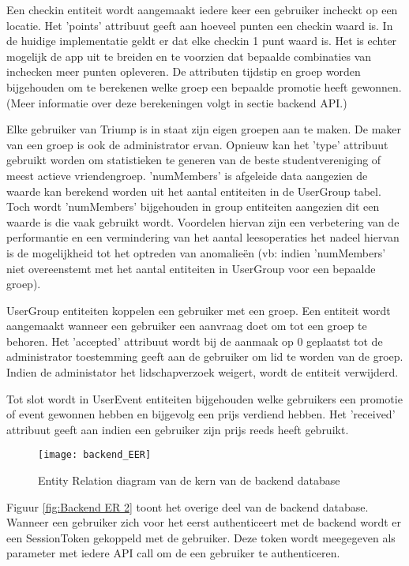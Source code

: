 Een checkin entiteit wordt aangemaakt iedere keer een gebruiker incheckt op een locatie. Het 'points' attribuut geeft aan hoeveel punten een checkin waard is. In de huidige implementatie geldt er dat elke checkin 1 punt waard is. Het is echter mogelijk de app uit te breiden en te voorzien dat bepaalde combinaties van inchecken meer punten opleveren. De attributen tijdstip en groep worden bijgehouden om te berekenen welke groep een bepaalde promotie heeft gewonnen. (Meer informatie over deze berekeningen volgt in sectie backend API.)

Elke gebruiker van Triump is in staat zijn eigen groepen aan te maken. De maker van een groep is ook de administrator ervan. Opnieuw kan het 'type' attribuut gebruikt worden om statistieken te generen van de beste studentvereniging of meest actieve vriendengroep. 'numMembers' is afgeleide data aangezien de waarde kan berekend worden uit het aantal entiteiten in de UserGroup tabel. Toch wordt 'numMembers' bijgehouden in group entiteiten aangezien dit een waarde is die vaak gebruikt wordt. Voordelen hiervan zijn een verbetering van de performantie en een vermindering van het aantal leesoperaties het nadeel hiervan is de mogelijkheid tot het optreden van anomalieën (vb: indien 'numMembers' niet overeenstemt met het aantal entiteiten in UserGroup voor een bepaalde groep).

UserGroup entiteiten koppelen een gebruiker met een groep. Een entiteit wordt aangemaakt wanneer een gebruiker een aanvraag doet om tot een groep te behoren. Het 'accepted' attribuut wordt bij de aanmaak op 0 geplaatst tot de administrator toestemming geeft aan de gebruiker om lid te worden van de groep. Indien de administator het lidschapverzoek weigert, wordt de entiteit verwijderd.

Tot slot wordt in UserEvent entiteiten bijgehouden welke gebruikers een promotie of event gewonnen hebben en bijgevolg een prijs verdiend hebben. Het 'received' attribuut geeft aan indien een gebruiker zijn prijs reeds heeft gebruikt.

\begin{figure}[H]
	\texttt{[image: backend\_EER]}
	\caption{Entity Relation diagram van de kern van de backend database}
	\label{fig:Backend ER}
\end{figure}

Figuur \ref{fig:Backend ER 2} toont het overige deel van de backend database. Wanneer een gebruiker zich voor het eerst authenticeert met de backend wordt er een SessionToken gekoppeld met de gebruiker. Deze token wordt meegegeven als parameter met iedere API call om de een gebruiker te authenticeren. 

